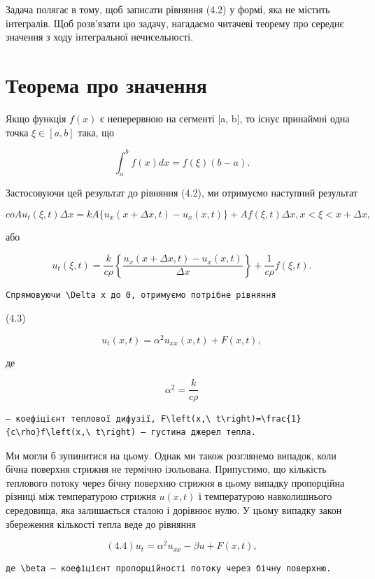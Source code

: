 \documentclass[
  ukrainian,
]{article}
\begin{document}
Задача полягає в тому, щоб записати рівняння (4.2) у формі, яка не
містить інтегралів. Щоб розв'язати цю задачу, нагадаємо читачеві теорему
про середнє значення з ходу інтегральної нечисельності.

\section{Теорема про
значення}\label{ux442ux435ux43eux440ux435ux43cux430-ux43fux440ux43e-ux437ux43dux430ux447ux435ux43dux43dux44f}

Якщо функція \(f(x)\) є неперервною на сегменті {[}a, b{]}, то існує
принаймні одна точка \(\xi \in [a, b]\) така, що

\[
\int_{a}^{b} f(x) dx = f(\xi) (b-a).
\]

Застосовуючи цей результат до рівняння (4.2), ми отримуємо наступний
результат

\[
coAu_{t}(\xi, t) \Delta x = kA\{u_{x}(x + \Delta x, t) - u_{x}(x, t)\} + Af(\xi, t) \Delta x,
x < \xi < x + \Delta x,
\]

або

\[
u_t(\xi, t) = \frac{k}{c\rho} \left\{ \frac{u_x(x + \Delta x, t) - u_x(x, t)}{\Delta x} \right\} + \frac{1}{c\rho} f(\xi, t).
\]

\begin{verbatim}
Спрямовуючи \Delta x до 0, отримуємо потрібне рівняння
\end{verbatim}

(4.3)

\[
u_t(x, t) = \alpha^2 u_{xx}(x, t) + F(x, t),
\]

де

\[
\alpha^{2}=\frac{k}{c\rho}
\]

\begin{verbatim}
— коефіцієнт теплової дифузії, F\left(x,\ t\right)=\frac{1}{c\rho}f\left(x,\ t\right) — густина джерел тепла.
\end{verbatim}

Ми могли б зупинитися на цьому. Однак ми також розглянемо випадок, коли
бічна поверхня стрижня не термічно ізольована. Припустимо, що кількість
теплового потоку через бічну поверхню стрижня в цьому випадку
пропорційна різниці між температурою стрижня \(u(x,t)\) і температурою
навколишнього середовища, яка залишається сталою і дорівнює нулю. У
цьому випадку закон збереження кількості тепла веде до рівняння

\[
(4.4) u_t = \alpha^2 u_{xx} - \beta u + F(x, t),
\]

\begin{verbatim}
де \beta — коефіцієнт пропорційності потоку через бічну поверхню.
\end{verbatim}
\end{document}
